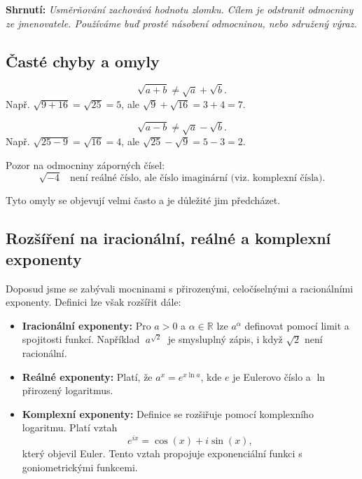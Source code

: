 \documentclass[12pt,a4paper]{article}
\begin{document}
\textbf{Shrnutí:} \emph{Usměrňování zachovává hodnotu zlomku. Cílem je odstranit odmocniny ze jmenovatele. Používáme buď prosté násobení odmocninou, nebo sdružený výraz.}

\newpage
\subsection{Časté chyby a omyly}

\begin{examplebox}
\[
\sqrt{a+b} \neq \sqrt{a} + \sqrt{b}.
\]  
Např. $\sqrt{9+16} = \sqrt{25} = 5$, ale $\sqrt{9}+\sqrt{16} = 3+4=7$.
\end{examplebox}

\begin{examplebox}
\[
\sqrt{a-b} \neq \sqrt{a} - \sqrt{b}.
\]  
Např. $\sqrt{25-9} = \sqrt{16} = 4$, ale $\sqrt{25}-\sqrt{9} = 5-3=2$.
\end{examplebox}

\begin{examplebox}
Pozor na odmocniny záporných čísel:  
\[
\sqrt{-4} \;\;\; \text{není reálné číslo, ale číslo imaginární (viz. komplexní čísla)}.
\]
\end{examplebox}

Tyto omyly se objevují velmi často a je důležité jim předcházet.

\subsection{Rozšíření na iracionální, reálné a komplexní exponenty}

Doposud jsme se zabývali mocninami s přirozenými, celočíselnými a racionálními exponenty.  
Definici lze však rozšířit dále:

\begin{itemize}
    \item \textbf{Iracionální exponenty:}  
    Pro $a>0$ a $\alpha \in \mathbb{R}$ lze $a^\alpha$ definovat pomocí limit a spojitosti funkcí.  
    Například $\; a^{\sqrt{2}} \;$ je smysluplný zápis, i když $\sqrt{2}$ není racionální.
    
    \item \textbf{Reálné exponenty:}  
    Platí, že $a^x = e^{x \ln a}$, kde $e$ je Eulerovo číslo a $\ln$ přirozený logaritmus.
    
    \item \textbf{Komplexní exponenty:}  
    Definice se rozšiřuje pomocí komplexního logaritmu.  
    Platí vztah
    \[
    e^{ix} = \cos(x) + i \sin(x),
    \]
    který objevil Euler.  
    Tento vztah propojuje exponenciální funkci s goniometrickými funkcemi.
\end{itemize}
\end{document}
